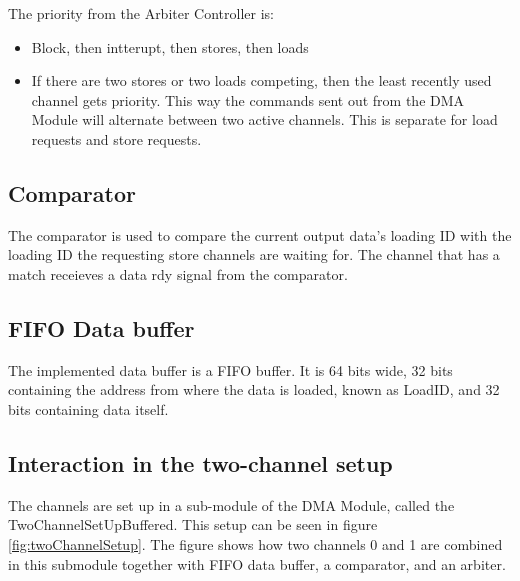 The priority from the Arbiter Controller is:
\begin{itemize}
    \item Block, then intterupt, then stores, then loads
    \item If there are two stores or two loads competing, then the least recently used channel gets priority.
    This way the commands sent out from the DMA Module will alternate between two active channels. 
    This is separate for load requests and store requests.
\end{itemize}

\subsection{Comparator}
The comparator is used to compare the current output data's loading ID with the loading ID the requesting store channels are waiting for.
The channel that has a match receieves a data rdy signal from the comparator. 

\subsection{FIFO Data buffer}
The implemented data buffer is a FIFO buffer.
It is 64 bits wide, 32 bits containing the address from where the data is loaded, known as LoadID, and 32 bits containing data itself.

\subsection{Interaction in the two-channel setup}
The channels are set up in a sub-module of the DMA Module, called the TwoChannelSetUpBuffered.
This setup can be seen in figure \ref{fig:twoChannelSetup}.
The figure shows how two channels 0 and 1 are combined in this submodule together with FIFO data buffer, a comparator, and an arbiter.

